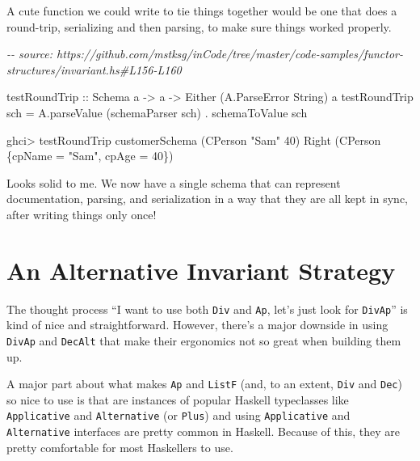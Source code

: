 \documentclass[]{article}
\newenvironment{Shaded}{}{}
\newcommand{\CommentTok}[1]{\textcolor[rgb]{0.38,0.63,0.69}{\textit{#1}}}
\newcommand{\DataTypeTok}[1]{\textcolor[rgb]{0.56,0.13,0.00}{#1}}
\newcommand{\DecValTok}[1]{\textcolor[rgb]{0.25,0.63,0.44}{#1}}
\newcommand{\NormalTok}[1]{#1}
\newcommand{\OperatorTok}[1]{\textcolor[rgb]{0.40,0.40,0.40}{#1}}
\newcommand{\OtherTok}[1]{\textcolor[rgb]{0.00,0.44,0.13}{#1}}
\newcommand{\StringTok}[1]{\textcolor[rgb]{0.25,0.44,0.63}{#1}}
\begin{document}
A cute function we could write to tie things together would be one that does a
round-trip, serializing and then parsing, to make sure things worked properly.

\begin{Shaded}
\begin{Highlighting}[]
\CommentTok{{-}{-} source: https://github.com/mstksg/inCode/tree/master/code{-}samples/functor{-}structures/invariant.hs\#L156{-}L160}

\NormalTok{testRoundTrip}
\OtherTok{    ::} \DataTypeTok{Schema}\NormalTok{ a}
    \OtherTok{{-}>}\NormalTok{ a}
    \OtherTok{{-}>} \DataTypeTok{Either}\NormalTok{ (}\DataTypeTok{A.ParseError} \DataTypeTok{String}\NormalTok{) a}
\NormalTok{testRoundTrip sch }\OtherTok{=}\NormalTok{ A.parseValue (schemaParser sch) }\OperatorTok{.}\NormalTok{ schemaToValue sch}
\end{Highlighting}
\end{Shaded}

\begin{Shaded}
\begin{Highlighting}[]
\NormalTok{ghci}\OperatorTok{>}\NormalTok{ testRoundTrip customerSchema (}\DataTypeTok{CPerson} \StringTok{"Sam"} \DecValTok{40}\NormalTok{)}
\DataTypeTok{Right}\NormalTok{ (}\DataTypeTok{CPerson}\NormalTok{ \{cpName }\OtherTok{=} \StringTok{"Sam"}\NormalTok{, cpAge }\OtherTok{=} \DecValTok{40}\NormalTok{\})}
\end{Highlighting}
\end{Shaded}

Looks solid to me. We now have a single schema that can represent documentation,
parsing, and serialization in a way that they are all kept in sync, after
writing things only once!

\hypertarget{an-alternative-invariant-strategy}{%
\section{An Alternative Invariant
Strategy}\label{an-alternative-invariant-strategy}}

The thought process ``I want to use both \texttt{Div} and \texttt{Ap}, let's
just look for \texttt{DivAp}'' is kind of nice and straightforward. However,
there's a major downside in using \texttt{DivAp} and \texttt{DecAlt} that make
their ergonomics not so great when building them up.

A major part about what makes \texttt{Ap} and \texttt{ListF} (and, to an extent,
\texttt{Div} and \texttt{Dec}) so nice to use is that are instances of popular
Haskell typeclasses like \texttt{Applicative} and \texttt{Alternative} (or
\texttt{Plus}) and using \texttt{Applicative} and \texttt{Alternative}
interfaces are pretty common in Haskell. Because of this, they are pretty
comfortable for most Haskellers to use.
\end{document}
